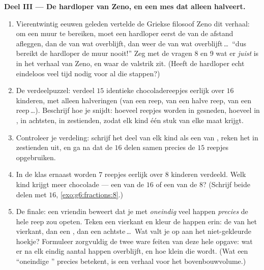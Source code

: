 \begin{problem}
\medskip
\noindent\textbf{Deel III --- De hardloper van Zeno, en een mes dat alleen
halveert.}
\begin{enumerate}[resume]
  \item Vierentwintig eeuwen geleden vertelde de Griekse filosoof Zeno dit
        verhaal: om een muur te bereiken, moet een hardloper eerst de  van
        de afstand afleggen, dan de  van wat overblijft, dan weer de 
        van wat overblijft\,\dots\ ``dus bereikt de hardloper de muur nooit!''
        Zeg met de vragen 8 en 9 wat er \emph{juist} is in het verhaal van
        Zeno, en waar de valstrik zit. (Heeft de hardloper echt eindeloos veel
        tijd nodig voor al die stappen?)
  \item De verdeelpuzzel: verdeel $15$ identieke chocoladereepjes eerlijk over
        $16$ kinderen, met alleen halveringen (van een reep, van een halve
        reep, van een  reep\,\dots). Beschrijf hoe je snijdt: hoeveel
        reepjes worden in  gesneden, hoeveel in , in achtsten, in
        zestienden, zodat elk kind één stuk van elke maat krijgt.
  \item Controleer je verdeling: schrijf het deel van elk kind als een  van
        , reken het in zestienden uit, en ga na dat de $16$ delen samen
        precies de $15$ reepjes opgebruiken.
  \item In de klas ernaast worden $7$ reepjes eerlijk over $8$ kinderen
        verdeeld. Welk kind krijgt meer chocolade --- een van de $16$ of een van
        de $8$? (Schrijf beide delen met  $16$,
        \cref{exo:g6:fractions:8}.)
  \item De finale: een vriendin beweert dat je met \emph{oneindig} veel happen
        \emph{precies} de hele reep zou opeten. Teken een vierkant en kleur de
        happen erin: de  van het vierkant, dan een , dan een
        achtste\,\dots\ Wat valt je op aan het niet-gekleurde hoekje? Formuleer
        zorgvuldig de twee ware feiten van deze hele opgave: wat er na elk
        eindig aantal happen overblijft, en hoe klein die  wordt. (Wat een
        ``oneindige '' precies betekent, is een verhaal voor het
        bovenbouwvolume.)
\end{enumerate}
\end{problem}
